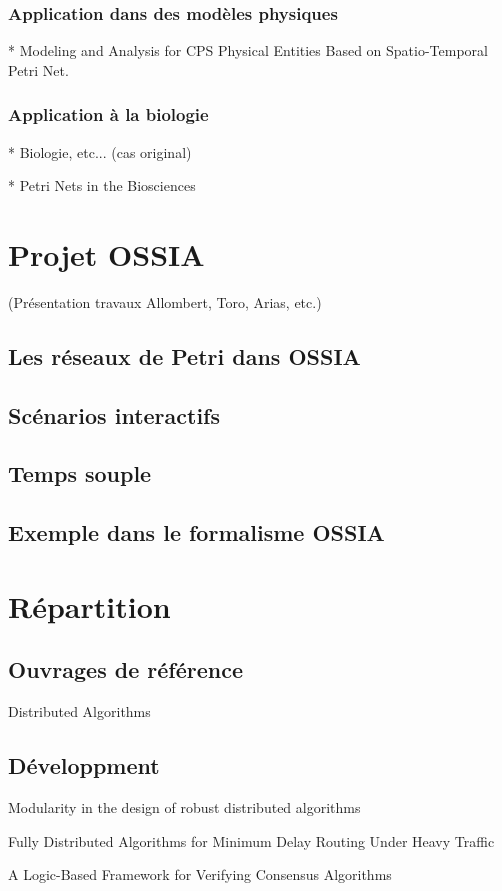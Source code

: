 \subsubsection{Application dans des modèles physiques}
* Modeling and Analysis for CPS Physical Entities Based on Spatio-Temporal Petri Net.
\subsubsection{Application à la biologie}
* Biologie, etc... (cas original)

* Petri Nets in the Biosciences

\section{Projet OSSIA}
(Présentation travaux Allombert, Toro, Arias, etc.)
\subsection{Les réseaux de Petri dans OSSIA}
\subsection{Scénarios interactifs}
\subsection{Temps souple}
\subsection{Exemple dans le formalisme OSSIA}

\section{Répartition}
\subsection{Ouvrages de référence}
Distributed Algorithms

\subsection{Développment}
Modularity in the design of robust distributed algorithms

Fully Distributed Algorithms for Minimum Delay Routing Under Heavy Traffic 

A Logic-Based Framework for Verifying Consensus Algorithms

